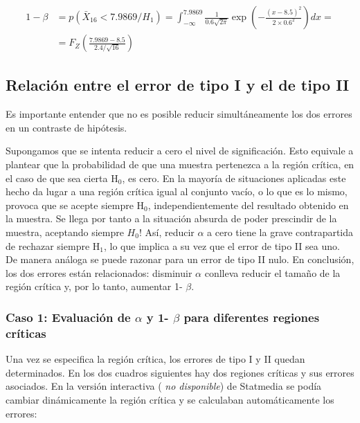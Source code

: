 \documentclass[
]{article}
\begin{document}
\[
\begin{aligned}
1-\beta & =p\left(\bar{X}_{16}<7.9869 / H_{1}\right)=\int_{-\infty}^{7.9869} \frac{1}{0.6 \sqrt{2 \pi}} \exp \left(-\frac{(x-8.5)^{2}}{2 \times 0.6^{2}}\right) d x =\\
& =F_{Z}\left(\frac{7.9869-8.5}{2.4 / \sqrt{16}}\right)
\end{aligned}
\]

\subsection{Relación entre el error de tipo I y el de tipo II}\label{relaciuxf3n-entre-el-error-de-tipo-i-y-el-de-tipo-ii}

Es importante entender que no es posible reducir simultáneamente los dos errores en un contraste de hipótesis.

Supongamos que se intenta reducir a cero el nivel de significación. Esto equivale a plantear que la probabilidad de que una muestra pertenezca a la región crítica, en el caso de que sea cierta \(\mathrm{H}_{0}\), es cero. En la mayoría de situaciones aplicadas este hecho da lugar a una región crítica igual al conjunto vacío, o lo que es lo mismo, provoca que se acepte siempre \(\mathrm{H}_{0}\), independientemente del resultado obtenido en la muestra. Se llega por tanto a la situación absurda de poder prescindir de la muestra, aceptando siempre \(H_{0}\)! Así, reducir \(\alpha\) a cero tiene la grave contrapartida de rechazar siempre \(\mathrm{H}_{1}\), lo que implica a su vez que el error de tipo II sea uno. De manera análoga se puede razonar para un error de tipo II nulo. En conclusión, los dos errores están relacionados: disminuir \(\alpha\) conlleva reducir el tamaño de la región crítica y, por lo tanto, aumentar 1- \(\beta\).

\subsubsection{\texorpdfstring{Caso 1: Evaluación de \(\alpha\) y 1- \(\beta\) para diferentes regiones críticas}{Caso 1: Evaluación de \textbackslash alpha y 1- \textbackslash beta para diferentes regiones críticas}}\label{caso-1-evaluaciuxf3n-de-alpha-y-1--beta-para-diferentes-regiones-cruxedticas}

Una vez se especifica la región crítica, los errores de tipo I y II quedan determinados. En los dos cuadros siguientes hay dos regiones críticas y sus errores asociados. En la versión interactiva ( \emph{no disponible}) de Statmedia se podía cambiar dinámicamente la región crítica y se calculaban automáticamente los errores:
\end{document}
